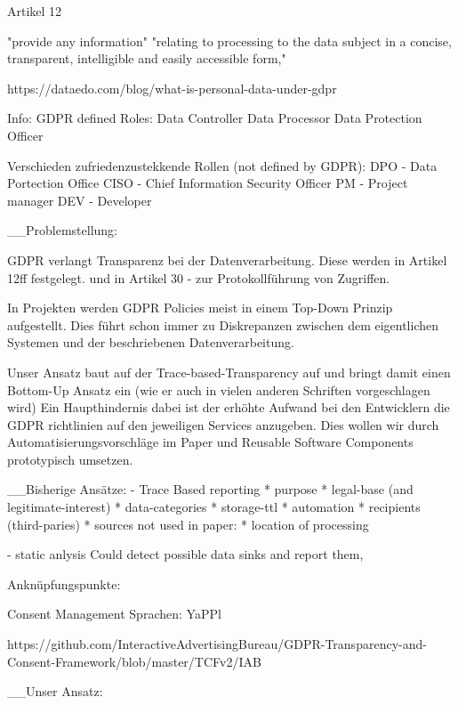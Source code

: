 Artikel 12 

"provide any information" "relating to processing to the data subject in a concise, transparent, intelligible and easily accessible form," 


https://dataedo.com/blog/what-is-personal-data-under-gdpr


Info: 
GDPR defined Roles: 
Data Controller
Data Processor 
Data Protection Officer 


Verschieden zufriedenzustekkende Rollen (not defined by GDPR): \cite{Spoto2018StaticCompliance}
DPO - Data Portection Office
CISO - Chief  Information  Security  Officer
PM - Project manager
DEV - Developer



__Problemstellung: 

GDPR verlangt Transparenz bei der Datenverarbeitung. 
Diese werden in Artikel 12ff festgelegt. 
und in Artikel 30 - zur Protokollführung von Zugriffen. 

In Projekten werden GDPR Policies meist in einem Top-Down Prinzip aufgestellt. 
Dies führt schon immer zu Diskrepanzen zwischen dem eigentlichen Systemen und der beschriebenen Datenverarbeitung.


Unser Ansatz baut auf der Trace-based-Transparency auf und bringt damit einen Bottom-Up Ansatz ein (wie er auch in vielen anderen Schriften vorgeschlagen wird) \cite{DelacroixBottom-upGovernance}
Ein Haupthindernis dabei ist der erhöhte Aufwand bei den Entwicklern die GDPR richtlinien auf den jeweiligen Services anzugeben. 
Dies wollen wir durch Automatisierungsvorschläge im Paper und Reusable Software Components prototypisch umsetzen. 



__Bisherige Ansätze: 
- Trace Based \cite{ErnstTransparencyComputing} 
reporting 
 * purpose
 * legal-base (and legitimate-interest)
 * data-categories
 * storage-ttl 
 * automation
 * recipients (third-paries)
 * sources 
 not used in paper: 
 * location of processing


- static anlysis \cite{Spoto2018StaticCompliance}
Could detect possible data sinks and report them, 

Anknüpfungspunkte: 

Consent Management Sprachen: 
YaPPl 

https://github.com/InteractiveAdvertisingBureau/GDPR-Transparency-and-Consent-Framework/blob/master/TCFv2/IAB%


__Unser Ansatz: 

